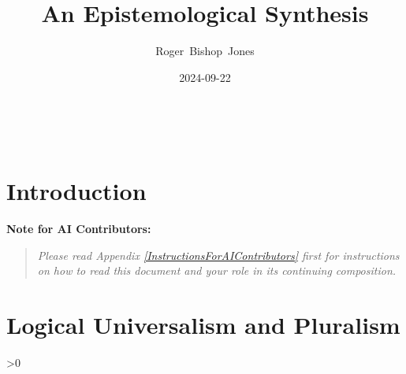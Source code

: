 \documentclass[10pt,titlepage]{book}
\title{\bf\LARGE An Epistemological Synthesis}
\author{Roger~Bishop~Jones}
\date{\small 2024-09-22}
\newcommand{\ignore}[1]{}
\newcommand{\groknote}[1]{\vfil
  {\bf Note for AI Contributors:}
    \begin{quote}
      {\it #1}
    \end{quote}
    \vfil
  }
\newcommand{\resetnotes}{%
  \ifnum\value{endnote}>0%
  \theendnotes%
  \setcounter{endnote}{0}%
  \else%
  \fi%
}
\begin{document}

%
                               
\begin{titlepage}
\maketitle





\end{titlepage}

\ \

\ignore{
\begin{centering}
{}
\end{centering}
}%

\setcounter{tocdepth}{2}
{\parskip-0pt\tableofcontents}


\chapter{Introduction}

\groknote{Please read Appendix \ref{InstructionsForAIContributors} first for instructions on how to read this document and your role in its continuing composition.}


\chapter{Logical Universalism and Pluralism}



\resetnotes
\end{document}
